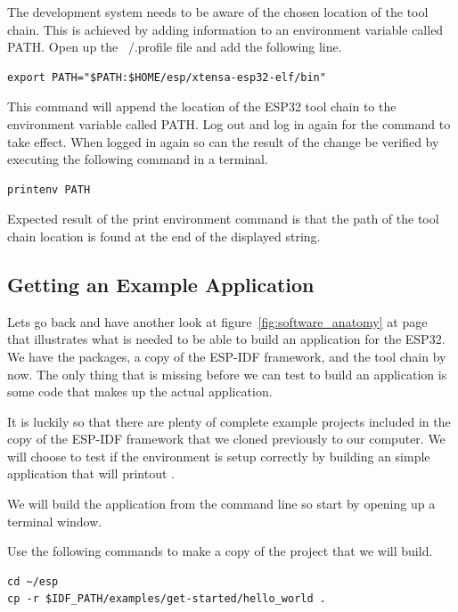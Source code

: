 \documentclass{tufte-book}
\begin{document}
The development system needs to be aware of the chosen location of the tool chain. This is achieved by adding information to an environment variable called PATH. Open up the ~/.profile file and add the following line.

\begin{lstlisting}
export PATH="$PATH:$HOME/esp/xtensa-esp32-elf/bin"
\end{lstlisting}

This command will append the location of the ESP32 tool chain to the environment variable called PATH. Log out and log in again for the command to take effect. When logged in again so can the result of the change be verified by executing the following command in a terminal.

\begin{lstlisting}
printenv PATH
\end{lstlisting}

Expected result of the print environment command is that the path of the tool chain location is found at the end of the displayed string.

\subsection{Getting an Example Application}
Lets go back and have another look at figure~\ref{fig:software_anatomy} at page~\pageref{fig:software_anatomy} that illustrates what is needed to be able to build an application for the ESP32. We have the packages, a copy of the ESP-IDF framework, and the tool chain by now. The only thing that is missing before we can test to build an application is some code that makes up the actual application.

It is luckily so that there are plenty of complete example projects included in the copy of the ESP-IDF framework that we cloned previously to our computer. We will choose to test if the environment is setup correctly by building an simple application that will printout .

We will build the application from the command line so start by opening up a terminal window.


Use the following commands to make a copy of the project that we will build.

\begin{lstlisting}
cd ~/esp
cp -r $IDF_PATH/examples/get-started/hello_world .
\end{lstlisting}
\end{document}
